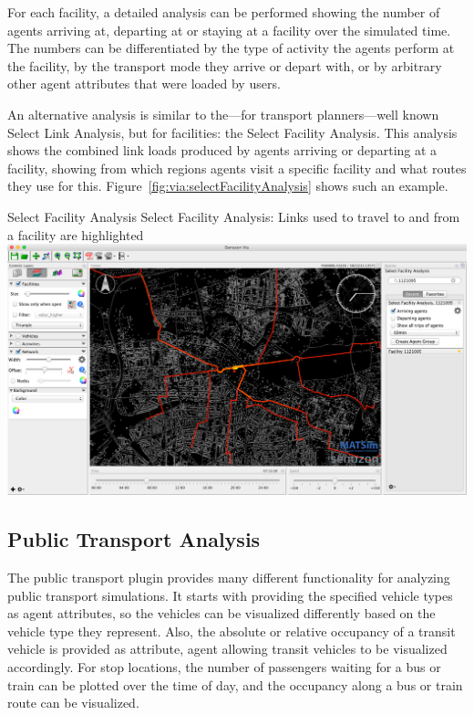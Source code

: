 For each facility, a detailed analysis can be performed showing the number of
agents arriving at, departing at or staying at a facility over the simulated
time. The numbers can be differentiated by the type of activity the agents
perform at the facility, by the transport mode they arrive or depart with, or by
arbitrary other agent attributes that were loaded by users.

An alternative analysis is similar to the---for transport planners---well known
Select Link Analysis, but for facilities: the Select Facility Analysis. This
analysis shows the combined link loads produced by agents arriving or departing
at a facility, showing from which regions agents visit a specific facility and
what routes they use for this. Figure~\ref{fig:via:selectFacilityAnalysis} shows
such an example.

\createfigure%
{Select Facility Analysis}%
{Select Facility Analysis: Links used to travel to and from a facility are highlighted}%
{\label{fig:via:selectFacilityAnalysis}}%
{\includegraphics[width=1.\textwidth,angle=0]{./extending/figures/via/selectFacilityAnalysis}}%
{}

\subsection{Public Transport Analysis}
The public transport plugin provides many different functionality for analyzing
public transport simulations. It starts with providing the specified vehicle
types as agent attributes, so the vehicles can be visualized differently based
on the vehicle type they represent. Also, the absolute or relative
occupancy of a transit vehicle is provided as attribute, agent allowing transit
vehicles to be visualized accordingly. For stop locations, the number of
passengers waiting for a bus or train can be plotted over the time of day, and
the occupancy along a bus or train route can be visualized.

